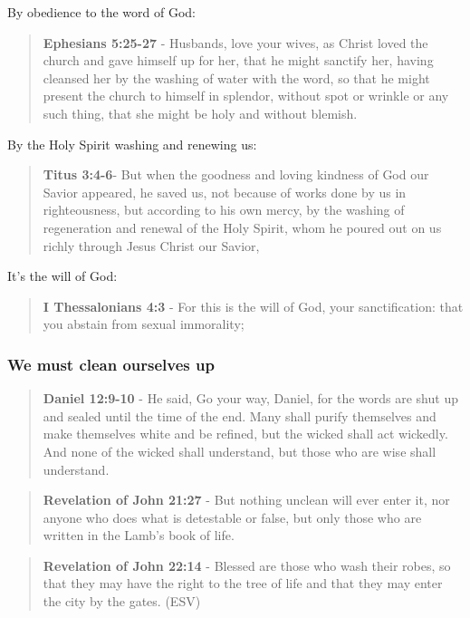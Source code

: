 \documentclass[11pt]{article}
\begin{document}
By obedience to the word of God:

\begin{quote}
\textbf{Ephesians 5:25-27} - Husbands, love your wives, as Christ loved the church and gave himself up for her, that he might sanctify her, having cleansed her by the washing of water with the word, so that he might present the church to himself in splendor, without spot or wrinkle or any such thing, that she might be holy and without blemish.
\end{quote}

By the Holy Spirit washing and renewing us:

\begin{quote}
\textbf{Titus 3:4-6}- But when the goodness and loving kindness of God our Savior appeared, he saved us, not because of works done by us in righteousness, but according to his own mercy, by the washing of regeneration and renewal of the Holy Spirit, whom he poured out on us richly through Jesus Christ our Savior,
\end{quote}

It's the will of God:

\begin{quote}
\textbf{I Thessalonians 4:3} - For this is the will of God, your sanctification: that you abstain from sexual immorality;
\end{quote}

\subsubsection{We \textbf{must} clean ourselves up}
\label{sec:org73c63d2}
\begin{quote}
\textbf{Daniel 12:9-10} - He said, Go your way, Daniel, for the words are shut up and sealed until the time of the end.  Many shall purify themselves and make themselves white and be refined, but the wicked shall act wickedly. And none of the wicked shall understand, but those who are wise shall understand.
\end{quote}

\begin{quote}
\textbf{Revelation of John 21:27} - But nothing unclean will ever enter it, nor anyone who does what is detestable or false, but only those who are written in the Lamb's book of life.
\end{quote}

\begin{quote}
\textbf{Revelation of John 22:14} - Blessed are those who wash their robes, so that they may have the right to the tree of life and that they may enter the city by the gates. (ESV)
\end{quote}
\end{document}
